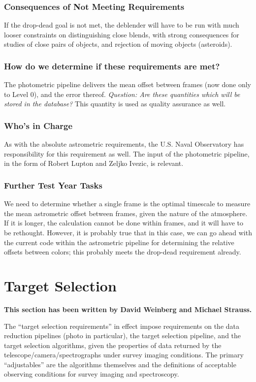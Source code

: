 \subsubsection{Consequences of Not Meeting Requirements}
If the drop-dead goal is not met, the deblender will have to be run
with much looser constraints on distinguishing close blends, with
strong consequences for studies of close pairs of objects, and
rejection of moving objects (asteroids). 

\subsubsection{How do we determine if these requirements are met?}
The photometric pipeline delivers the mean offset between frames (now
done only to Level 0),
and the error thereof.  {\it Question: Are these quantities which will
be stored in the database?}  This quantity is used as quality
assurance as well. 

\subsubsection{Who's in Charge}
As with the absolute astrometric requirements, the U.S. Naval
Observatory has responsibility for this requirement as well.  The
input of the photometric pipeline, in the form of Robert Lupton and
Zeljko Ivezic, is relevant. 

\subsubsection{Further Test Year Tasks}
We need to determine whether a single frame is the
optimal timescale to measure the mean astrometric offset between
frames, given the nature of the 
atmosphere.  If it is longer, the calculation cannot be done within
frames, and it will have to be rethought.  However, it is probably
true that in this case, we can go ahead with the current code within
the astrometric pipeline for determining the relative offsets between
colors; this probably meets the drop-dead requirement already. 



\section{Target Selection}
\label{sec:target}
{\bf This section has been written by David Weinberg and Michael Strauss.}

The ``target selection requirements'' in effect impose requirements
on the data reduction pipelines (photo in particular), the target
selection pipeline, and the target selection algorithms, given the
properties of data returned by the telescope/camera/spectrographs
under survey imaging conditions.  The primary ``adjustables'' are
the algorithms themselves and the definitions of acceptable
observing conditions for survey imaging and spectroscopy.


